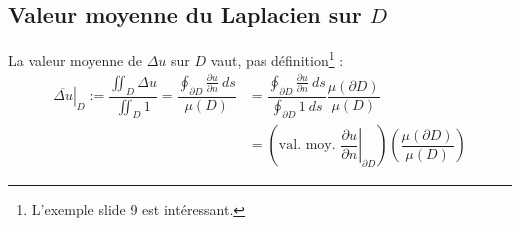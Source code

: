\documentclass[11pt, a4paper, openany]{book}
\begin{document}
																		
																		
				\subsection{Valeur moyenne du Laplacien sur $D$}
				La valeur moyenne de $\Delta u$ sur $D$ vaut, pas définition\footnote{L'exemple slide 9 est
				intéressant.} :
				\begin{equation}
					\begin{array}{ll}
						\left.\overline{\Delta u}\right|_D := \dfrac{\iint_D \Delta u}{\iint_D 1} = \dfrac{\oint_{
						\partial D} \frac{\partial u}{\partial n}\ ds}{\mu(D)} & = \dfrac{\oint_{\partial D}                                                                     
						\frac{\partial u}{\partial n}\ ds}{\oint_{\partial D} 1\ ds}\dfrac{\mu(\partial D)}{\mu(
						D)}\\
						                                                       & = \left(\text{val. moy. } \left.\dfrac{\partial u}{\partial n}\right|_{\partial D}\right)\left( 
						\dfrac{\mu(\partial D)}{\mu(
						D)}\right)
					\end{array}
				\end{equation}
																		
				
					
					
				\appendix
					
					
\end{document}
